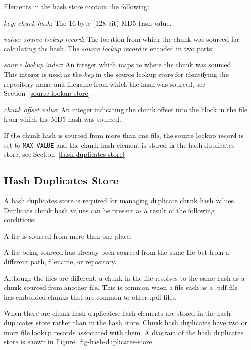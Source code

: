 \documentclass[12pt,twoside]{article}
\begin{document}
Elements in the hash store contain the following:
\begin{compactitem}
\item \emph{key: chunk hash}: The 16-byte (128-bit) MD5 hash value.
\item \emph{value: source lookup record}: The location from which the chunk was sourced
for calculating the hash.
The \emph{source lookup record} is encoded in two parts:
\begin{compactenum}
\item \emph{source lookup index}: An integer which maps to where the chunk was sourced.
This integer is used as the \emph{key} in the source lookup store
for identifying the repository name and filename
from which the hash was sourced, see Section~\ref{source-lookup-store}.
\item \emph{chunk offset value}: An integer indicating the chunk offset into the block in the file
from which the MD5 hash was sourced.
\end{compactenum}
\end{compactitem}
If the chunk hash is sourced from more than one file,
the source lookup record is set to \texttt{MAX\_VALUE}
and the chunk hash element is stored in the hash duplicates store,
see Section~\ref{hash-duplicates-store}.

\subsection{Hash Duplicates Store\label{hash-duplicates-store}}
A hash duplicates store is required for managing duplicate chunk hash values.
Duplicate chunk hash values can be present as a result of the following conditions:
\begin{compactitem}
\item A file is sourced from more than one place.
\item A file being sourced has already been sourced from the same file
but from a different path, filename, or repository.
\item Although the files are different, a chunk in the file resolves to the same hash as a chunk sourced from another file.
This is common when a file such as a .pdf file has embedded chunks
that are common to other .pdf files.
\end{compactitem}
When there are chunk hash duplicates,
hash elements are stored in the hash duplicates store rather than in the hash store.
Chunk hash duplicates have two or more file lookup records associated with them.
A diagram of the hash duplicates store is shown in Figure~\ref{fig-hash-duplicates-store}.
\end{document}
